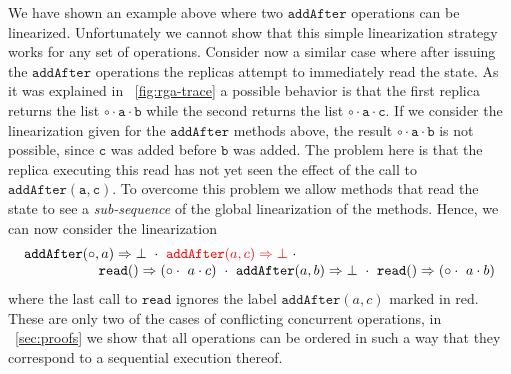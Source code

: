 We have shown an example above where two $\mathtt{addAfter}$
operations can be linearized.
%
Unfortunately we cannot show that this simple linearization strategy
works for any set of operations.
%
Consider now a similar case where after issuing the
$\mathtt{addAfter}$ operations the replicas attempt to immediately
read the state.
%
As it was explained in \figureautorefname~\ref{fig:rga-trace} a possible behavior is
that the first replica returns the list $\mathtt{\circ \cdot a \cdot
  b}$ while the second returns the list $\mathtt{\circ \cdot a \cdot
  c}$. 
%
If we consider the linearization given for the $\mathtt{addAfter}$
methods above, the result $\mathtt{\circ \cdot a \cdot b}$ is not
possible, since $\mathtt{c}$ was added before $\mathtt{b}$ was added.
%
The problem here is that the replica executing this read has not yet
seen the effect of the call to $\mathtt{addAfter(a, c)}$.
%
To overcome this problem we allow methods that read the state to see a
\emph{sub-sequence} of the global linearization of the methods.
%
Hence, we can now consider the linearization 
\[
  \begin{array}{c}
    \alabellong[\mathtt{addAfter}]{\circ,a}{\bot}\ \cdot\
    {\color{red} \alabellong[\mathtt{addAfter}]{a,c}{\bot}}\ \cdot \kern5cm\\    
    \hspace{\fill} \alabellong[\mathtt{read}]{}{(\circ \cdot\ a \cdot c)}\ \cdot\
    \alabellong[\mathtt{addAfter}]{a,b}{\bot}\ \cdot\
    \alabellong[\mathtt{read}]{}{(\circ \cdot\ a \cdot b)}
  \end{array}
\]
where the last call to $\mathtt{read}$ ignores the label
{\color{red} $\mathtt{addAfter}(a, c)$} marked in red.
%
These are only two of the cases of conflicting concurrent
operations, in \sectionautorefname~\ref{sec:proofs} we show that all operations
can be ordered in such a way that they correspond to a sequential
execution thereof.


